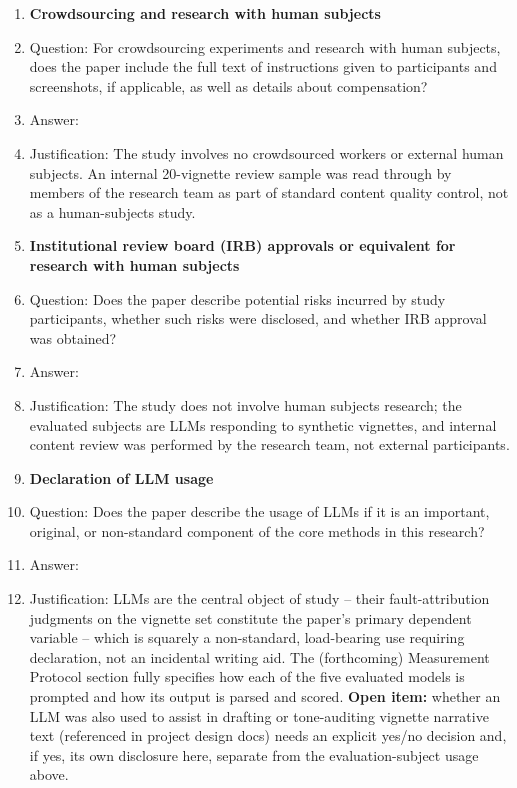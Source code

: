 \begin{enumerate}
\item {\bf Crowdsourcing and research with human subjects}
    \item[] Question: For crowdsourcing experiments and research with human subjects, does the paper include the full text of instructions given to participants and screenshots, if applicable, as well as details about compensation?
    \item[] Answer: \answerNA{}
    \item[] Justification: The study involves no crowdsourced workers or external human subjects. An internal 20-vignette review sample was read through by members of the research team as part of standard content quality control, not as a human-subjects study.

\item {\bf Institutional review board (IRB) approvals or equivalent for research with human subjects}
    \item[] Question: Does the paper describe potential risks incurred by study participants, whether such risks were disclosed, and whether IRB approval was obtained?
    \item[] Answer: \answerNA{}
    \item[] Justification: The study does not involve human subjects research; the evaluated subjects are LLMs responding to synthetic vignettes, and internal content review was performed by the research team, not external participants.

\item {\bf Declaration of LLM usage}
    \item[] Question: Does the paper describe the usage of LLMs if it is an important, original, or non-standard component of the core methods in this research?
    \item[] Answer: \answerYes{}
    \item[] Justification: LLMs are the central object of study -- their fault-attribution judgments on the vignette set constitute the paper's primary dependent variable -- which is squarely a non-standard, load-bearing use requiring declaration, not an incidental writing aid. The (forthcoming) Measurement Protocol section fully specifies how each of the five evaluated models is prompted and how its output is parsed and scored. \textbf{Open item:} whether an LLM was also used to assist in drafting or tone-auditing vignette narrative text (referenced in project design docs) needs an explicit yes/no decision and, if yes, its own disclosure here, separate from the evaluation-subject usage above.

\end{enumerate}
